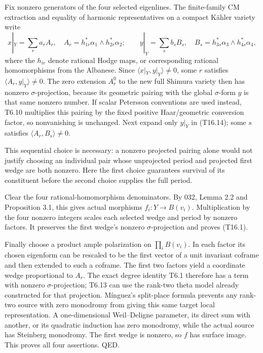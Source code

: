\documentclass[11pt,a4paper]{article}
\theoremstyle{definition}
\begin{document}
Fix nonzero generators of the four selected eigenlines. The finite-family CM extraction and equality of harmonic representatives on a compact Kähler variety write \[
x|_Y=\sum_r a_r A_r,\quad
A_r=h_{1r}^*\alpha_1\wedge h_{2r}^*\alpha_2;
\qquad
y|_Y=\sum_s b_s B_s,\quad
B_s=h_{3s}^*\alpha_3\wedge h_{4s}^*\alpha_4,
\tag{T16.14}
\] where the \(h_{ir}\) denote rational Hodge maps, or corresponding rational homomorphisms from the Albanese. Since \(\langle x|_Y,y|_Y\rangle\ne0\), some \(r\) satisfies \(\langle A_r,y|_Y\rangle\ne0\). The zero extension \(A_r^0\) to the new full Shimura variety then has nonzero \(\sigma\)-projection, because its geometric pairing with the global \(\sigma\)-form \(y\) is that same nonzero number. If scalar Petersson conventions are used instead, T6.10 multiplies this pairing by the fixed positive Haar/geometric conversion factor, so nonvanishing is unchanged. Next expand only \(y|_Y\) in (T16.14); some \(s\) satisfies \(\langle A_r,B_s\rangle\ne0\).

This sequential choice is necessary: a nonzero projected pairing alone would not justify choosing an individual pair whose unprojected period and projected first wedge are both nonzero. Here the first choice guarantees survival of its constituent before the second choice supplies the full period.

Clear the four rational-homomorphism denominators. By 032, Lemma 2.2 and Proposition 3.1, this gives actual morphisms \(f_i:Y\to B(v_i)\). Multiplication by the four nonzero integers scales each selected wedge and period by nonzero factors. It preserves the first wedge's nonzero \(\sigma\)-projection and proves (T16.1).

Finally choose a product ample polarization on \(\prod_i B(v_i)\). In each factor its chosen eigenform can be rescaled to be the first vector of a unit invariant coframe and then extended to such a coframe. The first two factors yield a coordinate wedge proportional to \(A_r\). The exact degree identity T6.1 therefore has a term with nonzero \(\sigma\)-projection; T6.13 can use the rank-two theta model already constructed for that projection. Mínguez's split-place formula prevents any rank-two source with zero monodromy from giving this same target local representation. A one-dimensional Weil--Deligne parameter, its direct sum with another, or its quadratic induction has zero monodromy, while the actual source has Steinberg monodromy. The first wedge is nonzero, so \(f\) has surface image. This proves all four assertions. QED.
\end{document}
